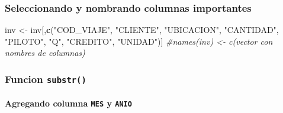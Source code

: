 \documentclass[]{article}
\newenvironment{Shaded}{\begin{snugshade}}{\end{snugshade}}
\newcommand{\KeywordTok}[1]{\textcolor[rgb]{0.13,0.29,0.53}{\textbf{#1}}}
\newcommand{\DecValTok}[1]{\textcolor[rgb]{0.00,0.00,0.81}{#1}}
\newcommand{\StringTok}[1]{\textcolor[rgb]{0.31,0.60,0.02}{#1}}
\newcommand{\CommentTok}[1]{\textcolor[rgb]{0.56,0.35,0.01}{\textit{#1}}}
\newcommand{\OperatorTok}[1]{\textcolor[rgb]{0.81,0.36,0.00}{\textbf{#1}}}
\newcommand{\NormalTok}[1]{#1}
\let\oldparagraph\paragraph
\renewcommand{\paragraph}[1]{\oldparagraph{#1}\mbox{}}
\begin{document}
\subsubsection{Seleccionando y nombrando columnas
importantes}\label{seleccionando-y-nombrando-columnas-importantes}

\begin{Shaded}
\begin{Highlighting}[]
\NormalTok{inv <-}\StringTok{ }\NormalTok{inv[,}\KeywordTok{c}\NormalTok{(}\StringTok{"COD_VIAJE"}\NormalTok{, }\StringTok{"CLIENTE"}\NormalTok{, }\StringTok{"UBICACION"}\NormalTok{, }\StringTok{"CANTIDAD"}\NormalTok{, }\StringTok{"PILOTO"}\NormalTok{, }\StringTok{"Q"}\NormalTok{, }\StringTok{"CREDITO"}\NormalTok{, }\StringTok{"UNIDAD"}\NormalTok{)]}
\CommentTok{#names(inv) <- c(vector con nombres de columnas)}
\end{Highlighting}
\end{Shaded}

\subsubsection{\texorpdfstring{Funcion
\texttt{substr()}}{Funcion substr()}}\label{funcion-substr}

\paragraph{\texorpdfstring{Agregando columna \texttt{MES} y
\texttt{ANIO}}{Agregando columna MES y ANIO}}\label{agregando-columna-mes-y-anio}

\begin{Shaded}
\end{Shaded}
\end{document}
